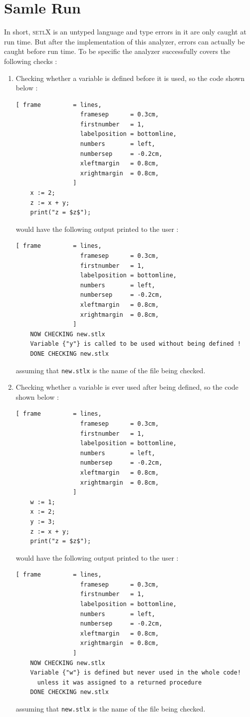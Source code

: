\documentclass[11pt]{report}
\begin{document}
\section{Samle Run}
In short, \textsc{setlX} is an untyped language and type errors in it are only caught at run time. But after the implementation of this analyzer, errors can actually be caught before run time. To be specific the analyzer successfully covers the following checks :
\begin{enumerate}
\item Checking whether a variable is defined before it is used, so the code shown below :
\begin{Verbatim}[ frame         = lines, 
                  framesep      = 0.3cm, 
                  firstnumber   = 1,
                  labelposition = bottomline,
                  numbers       = left,
                  numbersep     = -0.2cm,
                  xleftmargin   = 0.8cm,
                  xrightmargin  = 0.8cm,
                ]
    x := 2;
    z := x + y;
    print("z = $z$");
\end{Verbatim}
would have the following output printed to the user :
\begin{Verbatim}[ frame         = lines, 
                  framesep      = 0.3cm, 
                  firstnumber   = 1,
                  labelposition = bottomline,
                  numbers       = left,
                  numbersep     = -0.2cm,
                  xleftmargin   = 0.8cm,
                  xrightmargin  = 0.8cm,
                ]
    NOW CHECKING new.stlx
    Variable {"y"} is called to be used without being defined !
    DONE CHECKING new.stlx
\end{Verbatim}
assuming that \texttt{new.stlx} is the name of the file being checked.

\item Checking whether a variable is ever used after being defined, so the code shown below :
\begin{Verbatim}[ frame         = lines, 
                  framesep      = 0.3cm, 
                  firstnumber   = 1,
                  labelposition = bottomline,
                  numbers       = left,
                  numbersep     = -0.2cm,
                  xleftmargin   = 0.8cm,
                  xrightmargin  = 0.8cm,
                ]
    w := 1;
    x := 2;
    y := 3;
    z := x + y;
    print("z = $z$");
\end{Verbatim}
would have the following output printed to the user :
\pagebreak
\begin{Verbatim}[ frame         = lines, 
                  framesep      = 0.3cm, 
                  firstnumber   = 1,
                  labelposition = bottomline,
                  numbers       = left,
                  numbersep     = -0.2cm,
                  xleftmargin   = 0.8cm,
                  xrightmargin  = 0.8cm,
                ]
    NOW CHECKING new.stlx
    Variable {"w"} is defined but never used in the whole code! 
      unless it was assigned to a returned procedure
    DONE CHECKING new.stlx
\end{Verbatim}
assuming that \texttt{new.stlx} is the name of the file being checked.


\end{enumerate}
\end{document}
